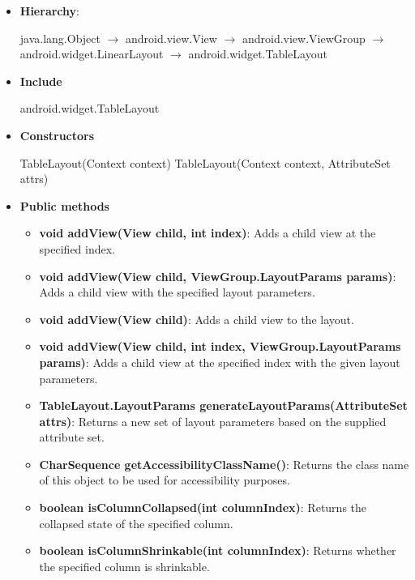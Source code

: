 \documentclass{report}
\begin{document}
    \begin{itemize}
        \item \textbf{Hierarchy}:
            \begin{center}
                java.lang.Object $\to $	android.view.View $\to $	android.view.ViewGroup $\to $	android.widget.LinearLayout $\to $	android.widget.TableLayout
            \end{center}
        \item \textbf{Include}
            \bigbreak \noindent 
            \begin{javacode}
                android.widget.TableLayout
            \end{javacode}
        \item \textbf{Constructors}
            \bigbreak \noindent 
            \begin{javacode}
                TableLayout(Context context)
                TableLayout(Context context, AttributeSet attrs)
            \end{javacode}
        \item \textbf{Public methods}
            \begin{itemize}
                \item \textbf{void addView(View child, int index)}: Adds a child view at the specified index.
                \item \textbf{void addView(View child, ViewGroup.LayoutParams params)}: Adds a child view with the specified layout parameters.
                \item \textbf{void addView(View child)}: Adds a child view to the layout.
                \item \textbf{void addView(View child, int index, ViewGroup.LayoutParams params)}: Adds a child view at the specified index with the given layout parameters.
                \item \textbf{TableLayout.LayoutParams generateLayoutParams(AttributeSet attrs)}: Returns a new set of layout parameters based on the supplied attribute set.
                \item \textbf{CharSequence getAccessibilityClassName()}: Returns the class name of this object to be used for accessibility purposes.
                \item \textbf{boolean isColumnCollapsed(int columnIndex)}: Returns the collapsed state of the specified column.
                \item \textbf{boolean isColumnShrinkable(int columnIndex)}: Returns whether the specified column is shrinkable.

\end{itemize}
\end{itemize}
\end{document}
